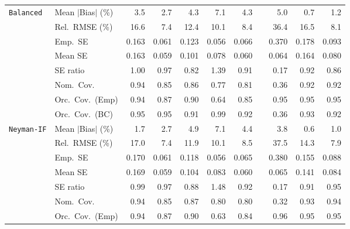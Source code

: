 \begin{landscape}
\begin{longtable}{llrrrrrrrrr}
\addlinespace[2pt]
\quad \texttt{Balanced} & Mean $|$Bias$|$ (\%) & 3.5 & \cellcolor{rankthree}2.7 & 4.3 & 7.1 & 4.3 &  & 5.0 & \cellcolor{rankone}0.7 & \cellcolor{ranktwo}1.2 \\
 & Rel.\ RMSE (\%) & 16.6 & \cellcolor{rankone}7.4 & 12.4 & 10.1 & \cellcolor{rankthree}8.4 &  & 36.4 & 16.5 & \cellcolor{ranktwo}8.1 \\
 & Emp.\ SE & 0.163 & 0.061 & 0.123 & 0.056 & 0.066 &  & 0.370 & 0.178 & 0.093 \\
 & Mean SE & 0.163 & 0.059 & 0.101 & 0.078 & 0.060 &  & 0.064 & 0.164 & 0.080 \\
 & SE ratio & \cellcolor{rankone}1.00 & \cellcolor{ranktwo}0.97 & 0.82 & 1.39 & 0.91 &  & 0.17 & \cellcolor{rankthree}0.92 & 0.86 \\
 & Nom.\ Cov. & \cellcolor{rankone}0.94 & 0.85 & \cellcolor{rankthree}0.86 & 0.77 & 0.81 &  & 0.36 & \cellcolor{ranktwo}0.92 & \cellcolor{ranktwo}0.92 \\
 & Orc.\ Cov.\ (Emp) & \cellcolor{ranktwo}0.94 & 0.87 & \cellcolor{rankthree}0.90 & 0.64 & 0.85 &  & \cellcolor{rankone}0.95 & \cellcolor{rankone}0.95 & \cellcolor{rankone}0.95 \\
 & Orc.\ Cov.\ (BC) & \cellcolor{rankone}0.95 & \cellcolor{rankone}0.95 & 0.91 & 0.99 & \cellcolor{rankthree}0.92 &  & 0.36 & \cellcolor{ranktwo}0.93 & \cellcolor{rankthree}0.92 \\
\addlinespace[2pt]
\quad \texttt{Neyman-IF} & Mean $|$Bias$|$ (\%) & \cellcolor{rankthree}1.7 & 2.7 & 4.9 & 7.1 & 4.4 &  & 3.8 & \cellcolor{rankone}0.6 & \cellcolor{ranktwo}1.0 \\
 & Rel.\ RMSE (\%) & 17.0 & \cellcolor{rankone}7.4 & 11.9 & 10.1 & \cellcolor{rankthree}8.5 &  & 37.5 & 14.3 & \cellcolor{ranktwo}7.9 \\
 & Emp.\ SE & 0.170 & 0.061 & 0.118 & 0.056 & 0.065 &  & 0.380 & 0.155 & 0.088 \\
 & Mean SE & 0.169 & 0.059 & 0.104 & 0.083 & 0.060 &  & 0.065 & 0.141 & 0.084 \\
 & SE ratio & \cellcolor{rankone}0.99 & \cellcolor{ranktwo}0.97 & 0.88 & 1.48 & 0.92 &  & 0.17 & 0.91 & \cellcolor{rankthree}0.95 \\
 & Nom.\ Cov. & \cellcolor{rankone}0.94 & 0.85 & \cellcolor{rankthree}0.87 & 0.80 & 0.80 &  & 0.32 & \cellcolor{ranktwo}0.93 & \cellcolor{rankone}0.94 \\
 & Orc.\ Cov.\ (Emp) & \cellcolor{ranktwo}0.94 & 0.87 & \cellcolor{rankthree}0.90 & 0.63 & 0.84 &  & \cellcolor{ranktwo}0.96 & \cellcolor{rankone}0.95 & \cellcolor{rankone}0.95 \\

\end{longtable}
\end{landscape}
